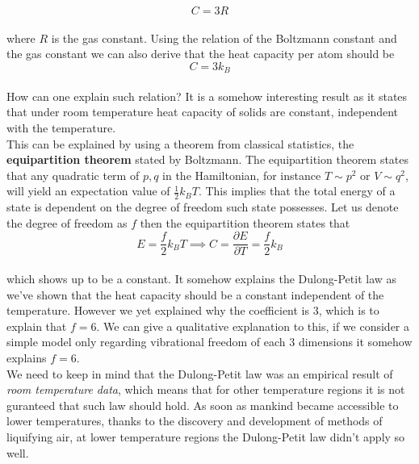 \documentclass[paper=a4, fontsize=11pt]{scrartcl}
\newcommand{\boltz}{k_B}
\newcommand{\pder}[2]{\frac{\partial #1}{\partial #2}}
\begin{document}
\begin{equation}\nonumber
	C = 3R
\end{equation}\\

where $R$ is the gas constant. Using the relation of the Boltzmann constant and the gas constant we can also derive that the heat capacity per atom should be \\

\begin{equation}\nonumber
	C = 3 \boltz
\end{equation}\\

How can one explain such relation? It is a somehow interesting result as it states that under room temperature heat capacity of solids are constant, independent with the temperature. \\

This can be explained by using a theorem from classical statistics, the \textbf{equipartition theorem} stated by Boltzmann. The equipartition theorem states that any quadratic term of $p,q$ in the Hamiltonian, for instance $T \sim p^2$ or $V \sim q^2$, will yield an expectation value of $\frac{1}{2} \boltz T$. This implies that the total energy of a state is dependent on the degree of freedom such state possesses. Let us denote the degree of freedom as $f$ then the equipartition theorem states that \\

\begin{equation}\nonumber
	E = \frac{f}{2} \boltz T \implies C = \pder{E}{T} = \frac{f}{2} \boltz 
\end{equation}\\

which shows up to be a constant. It somehow explains the Dulong-Petit law as we've shown that the heat capacity should be a constant independent of the temperature. However we yet explained why the coefficient is $3$, which is to explain that $f=6$. We can give a qualitative explanation to this, if we consider a simple model only regarding vibrational freedom of each 3 dimensions it somehow explains $f=6$. \\

We need to keep in mind that the Dulong-Petit law was an empirical result of \textit{room temperature data}, which means that for other temperature regions it is not guranteed that such law should hold. As soon as mankind became accessible to lower temperatures, thanks to the discovery and development of methods of liquifying air, at lower temperature regions the Dulong-Petit law didn't apply so well.\\
\end{document}
